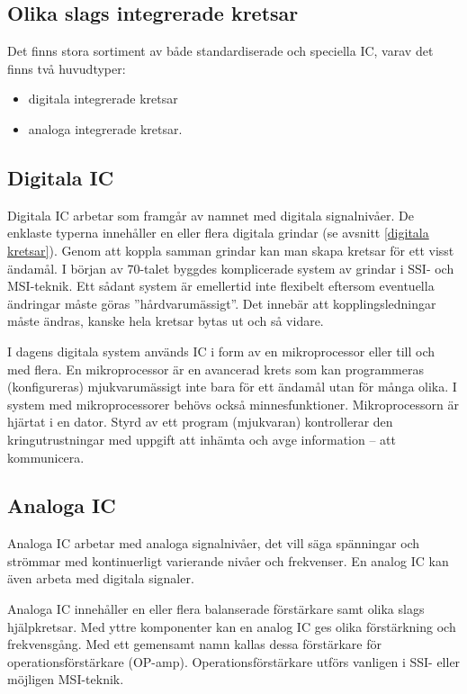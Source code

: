 \subsection{Olika slags integrerade kretsar}

Det finns stora sortiment av både standardiserade och speciella IC, varav det
finns två huvudtyper:
\begin{itemize}
  \item digitala integrerade kretsar
  \item analoga integrerade kretsar.
\end{itemize}

\subsection{Digitala IC}

Digitala IC arbetar som framgår av namnet med digitala signalnivåer.
De enklaste typerna innehåller en eller flera digitala grindar (se avsnitt
\ref{digitala kretsar}).
Genom att koppla samman grindar kan man skapa kretsar för ett visst ändamål.
I början av 70-talet byggdes komplicerade system av grindar i SSI- och
MSI-teknik.
Ett sådant system är emellertid inte flexibelt eftersom eventuella ändringar
måste göras ''hårdvarumässigt''.
Det innebär att kopplingsledningar måste ändras, kanske hela kretsar bytas ut
och så vidare.

I dagens digitala system används IC i form av en mikroprocessor eller till och
med flera.
En mikroprocessor är en avancerad krets som kan programmeras (konfigureras)
mjukvarumässigt inte bara för ett ändamål utan för många olika.
I system med mikroprocessorer behövs också minnesfunktioner.
Mikroprocessorn är hjärtat i en dator.
Styrd av ett program (mjukvaran) kontrollerar den kringutrustningar med uppgift
att inhämta och avge information -- att kommunicera.

\subsection{Analoga IC}

Analoga IC arbetar med analoga signalnivåer, det vill säga spänningar och
strömmar med kontinuerligt varierande nivåer och frekvenser.
En analog IC kan även arbeta med digitala signaler.

Analoga IC innehåller en eller flera balanserade förstärkare samt olika slags
hjälpkretsar.
Med yttre komponenter kan en analog IC ges olika förstärkning och frekvensgång.
Med ett gemensamt namn kallas dessa förstärkare för operationsförstärkare
(OP-amp).
Operationsförstärkare utförs vanligen i SSI- eller möjligen MSI-teknik.

